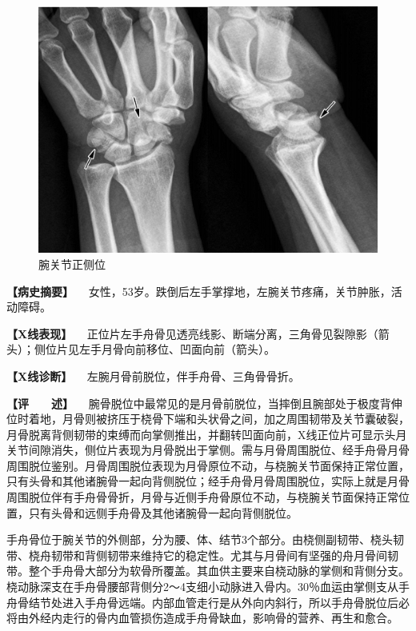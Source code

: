 \begin{figure}[!htbp]
 \centering
 \includegraphics{./images/Image00040.jpg}
 \captionsetup{justification=centering}
 \caption{腕关节正侧位}
 \label{fig2-3-13}
  \end{figure} 

\textbf{【病史摘要】}
　女性，53岁。跌倒后左手掌撑地，左腕关节疼痛，关节肿胀，活动障碍。

\textbf{【X线表现】}
　正位片左手舟骨见透亮线影、断端分离，三角骨见裂隙影（箭头）；侧位片见左手月骨向前移位、凹面向前（箭头）。

\textbf{【X线诊断】} 　左腕月骨前脱位，伴手舟骨、三角骨骨折。

\textbf{【评　　述】}
　腕骨脱位中最常见的是月骨前脱位，当摔倒且腕部处于极度背伸位时着地，月骨则被挤压于桡骨下端和头状骨之间，加之周围韧带及关节囊破裂，月骨脱离背侧韧带的束缚而向掌侧推出，并翻转凹面向前，X线正位片可显示头月关节间隙消失，侧位片表现为月骨脱出于掌侧。需与月骨周围脱位、经手舟骨月骨周围脱位鉴别。月骨周围脱位表现为月骨原位不动，与桡腕关节面保持正常位置，只有头骨和其他诸腕骨一起向背侧脱位；经手舟骨月骨周围脱位，实际上就是月骨周围脱位伴有手舟骨骨折，月骨与近侧手舟骨原位不动，与桡腕关节面保持正常位置，只有头骨和远侧手舟骨及其他诸腕骨一起向背侧脱位。

手舟骨位于腕关节的外侧部，分为腰、体、结节3个部分。由桡侧副韧带、桡头韧带、桡舟韧带和背侧韧带来维持它的稳定性。尤其与月骨间有坚强的舟月骨间韧带。整个手舟骨大部分为软骨所覆盖。其血供主要来自桡动脉的掌侧和背侧分支。桡动脉深支在手舟骨腰部背侧分2～4支细小动脉进入骨内。30％血运由掌侧支从手舟骨结节处进入手舟骨远端。内部血管走行是从外向内斜行，所以手舟骨脱位后必将由外经内走行的骨内血管损伤造成手舟骨缺血，影响骨的营养、再生和愈合。

